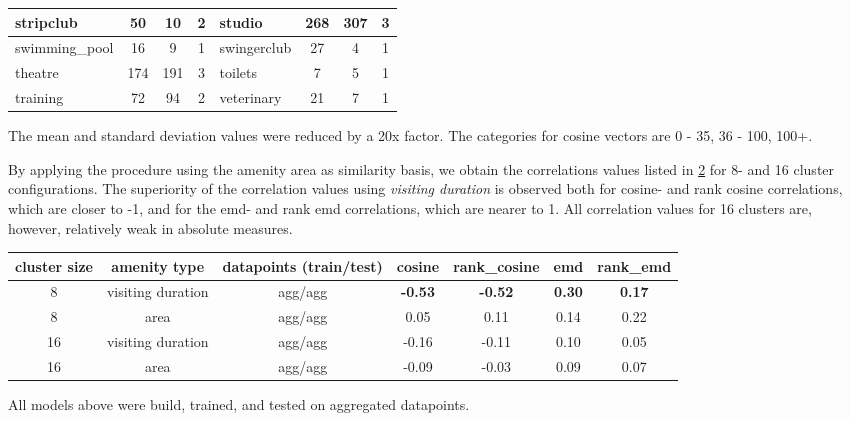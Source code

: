 \documentclass{ws-ijait}
\begin{document}
\begin{table}[!ht]
{\begin{tabular}{ | l | c | c | c || l | c | c | c |}
				stripclub & 50 & 10 & 2 & studio & 268 & 307 & 3 \\ \hline
				swimming\_pool & 16 & 9 & 1 & swingerclub & 27 & 4 & 1 \\ \hline
				theatre & 174 & 191 & 3 & toilets & 7 & 5 & 1 \\ \hline
				training & 72 & 94 & 2 & veterinary & 21 & 7 & 1 \\ \hline
		\end{tabular}}
		\label{tab:amenity_area_values}
		\begin{tabnote}
			The mean and standard deviation values were reduced by a 20x factor. The categories for cosine vectors are 0 - 35, 36 - 100, 100+.
		\end{tabnote}
	\end{table}
	
	By applying the procedure using the amenity area as similarity basis, we obtain the correlations values listed in \cref{tab:correlation_amenity_area} for 8- and 16 cluster configurations. The superiority of the correlation values using \textit{visiting duration} is observed both for cosine- and rank cosine correlations, which are closer to -1, and for the emd- and rank emd correlations, which are nearer to 1. All correlation values for 16 clusters are, however, relatively weak in absolute measures.
	
	\begin{table}[!ht]
		{\begin{tabular}{ | c | c | c | c | c | c | c | }
				\hline
				{cluster size} 	& {amenity type} 	& datapoints (train/test) 	& cosine 	& rank\_cosine & emd & rank\_emd \\ \hline
				8 				& {visiting duration} 		& agg/agg 		& \textbf{-0.53}	& \textbf{-0.52}		&	\textbf{0.30}	&	\textbf{0.17} \\ \hline
				8 				& area 				& agg/agg 		& 0.05	&	0.11	&	0.14	&	0.22 \\ \hline \hline
				16 				& {visiting duration} 		& agg/agg 		& -0.16	&	-0.11	&	0.10	&	0.05 \\ \hline
				16 				& area 				& agg/agg 		& -0.09	&	-0.03	&	0.09	&	0.07 \\ \hline
		\end{tabular}}
		\begin{tabnote}
			All models above were build, trained, and tested on aggregated datapoints.  
		\end{tabnote}
		\label{tab:correlation_amenity_area}
	\end{table}
							
\end{document}
